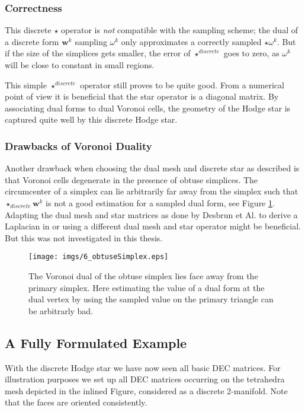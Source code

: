 \subsubsection{Correctness}

This discrete $\star$ operator is \emph{not} compatible with the sampling scheme; the dual of a discrete form $\textbf{w}^k$ sampling $\omega^k$ only approximates a correctly sampled $\star \omega^k$. But if the size of the simplices gets smaller, the error of $\star^{discrete}$ goes to zero, as $\omega^k$ will be close to constant in small regions.

This simple $\star^{discrete}$ operator still proves to be quite good. From a numerical point of view it is beneficial that the star operator is a diagonal matrix. By associating dual forms to dual Voronoi cells, the geometry of the Hodge star is captured quite well by this discrete Hodge star. 


\subsubsection{Drawbacks of Voronoi Duality}

Another drawback when choosing the dual mesh and discrete star as described is that Voronoi cells degenerate in the presence of obtuse simplices. The circumcenter of a simplex can lie arbitrarily far away from the simplex such that $\star_{discrete}\textbf{w}^k$ is not a good estimation for a sampled dual form, see Figure \ref{fig:6_obtuse}. Adapting the dual mesh and star matrices as done by Desbrun et Al. to derive a Laplacian in \cite{laplacebeltrami} or using a different dual mesh and star operator might be beneficial. But this was not investigated in this thesis. 
\begin{figure}%
\begin{center}
\texttt{[image: imgs/6\_obtuseSimplex.eps]}%
\end{center}
\caption{The Voronoi dual of the obtuse simplex lies face away from the primary simplex. Here estimating the value of a dual form at the dual vertex by using the sampled value on the primary triangle can be arbitrarly bad.}%
\label{fig:6_obtuse}%
\end{figure}


\subsection{A Fully Formulated Example}
\label{sec:ECDEC_fullexample}
With the discrete Hodge star we have now seen all basic DEC matrices. For illustration purposes we set up all DEC matrices occurring on the tetrahedra mesh depicted in the inlined Figure, considered as a discrete 2-manifold. Note that the faces are oriented consistently.

